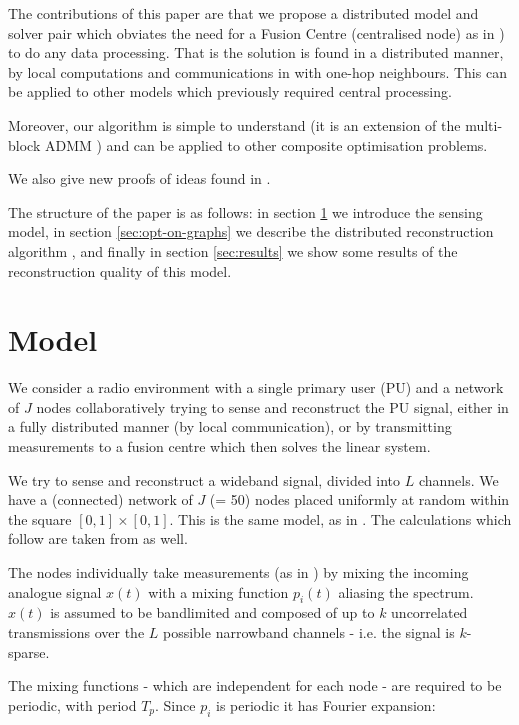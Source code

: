 \documentclass[conference]{IEEEtran}
\begin{document}
The contributions of this paper are that we propose a distributed model and solver pair which obviates the need for a Fusion Centre (centralised node) as in \cite{Zhang2011b}) to do any data processing. That is the solution is found in a distributed manner, by local computations and communications in with one-hop neighbours. This can be applied to other models which previously required central processing.

Moreover, our algorithm is simple to understand (it is an extension of the multi-block ADMM \cite{mota2013d}) and can be applied to other composite optimisation problems.

We also give new proofs of ideas found in \cite{mota2013d}. 

The structure of the paper is as follows: in section \ref{sec:sensingmodel} we introduce the sensing model, in section \ref{sec:opt-on-graphs} we describe the distributed reconstruction algorithm \cite{mota2013d}, and finally in section \ref{sec:results} we show some results of the reconstruction quality of this model. 

\section{Model}\label{sec:sensingmodel}

We consider a radio environment with a single primary user (PU) and a network of \(J\) nodes collaboratively trying to sense and reconstruct the PU signal, either in a fully distributed manner (by local communication), or by transmitting measurements to a fusion centre which then solves the linear system. 

We try to sense and reconstruct a wideband signal, divided into \(L\) channels. We have a (connected) network of \(J\) (= 50) nodes placed uniformly at random within the square \(  \left[0,1\right]\times \left[0,1\right] \). This is the same model, as in \cite{Zhang2011b}. The calculations which follow are taken from \cite{Zhang2011b} as well.

The nodes individually take measurements (as in \cite{mishali2010theory}) by mixing the incoming analogue signal \(x\left(t\right)\) with a mixing function \(p_i\left(t\right)\) aliasing the spectrum. \(x\left(t\right)\) is assumed to be bandlimited and composed of up to \(k\) uncorrelated transmissions over the \(L\) possible narrowband channels - i.e. the signal is \(k\)-sparse. 

The mixing functions - which are independent for each node - are required to be periodic, with period \(T_p\). Since \(p_i\) is periodic it has Fourier expansion:
\end{document}
